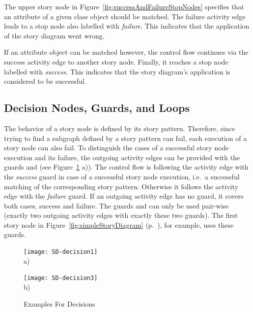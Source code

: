 The upper story node in Figure~\ref{fig:successAndFailureStopNodes} specifies that an attribute of a given class object should be matched.
The failure activity edge leads to a stop node also labelled with \emph{failure}.
This indicates that the application of the story diagram went wrong.

If an attribute object can be matched however, the control flow continues via the success activity edge to another story node.
Finally, it reaches a stop node labelled with \emph{success}.
This indicates that the story diagram's application is considered to be successful.


\subsection{Decision Nodes, Guards, and Loops}
\label{sec:DecisionNodesEtc}

The behavior of a story node is defined by its story pattern.
Therefore,
since trying to find a subgraph defined by a story pattern can fail,
each execution of a story node can also fail.
To distinguish the cases of a successful story node execution and its failure,
the outgoing activity edges can be provided with the guards  and  (see Figure~\ref{fig:SD-decisions} a)).
The control flow is following the activity edge with the \emph{success} guard in case of a successful story node execution,
i.e.\ a successful matching of the corresponding story pattern.
Otherwise it follows the activity edge with the \emph{failure} guard.
If an outgoing activity edge has no guard, it covers both cases, success and failure.
The guards  and  can only be used pair-wise (exactly two outgoing activity edges with exactly these two guards).
The first story node in Figure~\ref{fig:simpleStoryDiagram} (p.~\pageref{fig:simpleStoryDiagram}), for example, uses these guards.

\begin{figure}[htb]
	\centering
  \begin{minipage}[t]{.5\textwidth}
    \centering
    \texttt{[image: SD-decision1]}
    \\a)
  \end{minipage}%
  \hfill
  \begin{minipage}[t]{.5\textwidth}
    \centering
    \texttt{[image: SD-decision3]}
    \\b)
  \end{minipage}
  \caption{Examples For Decisions}
  \label{fig:SD-decisions}
\end{figure}

